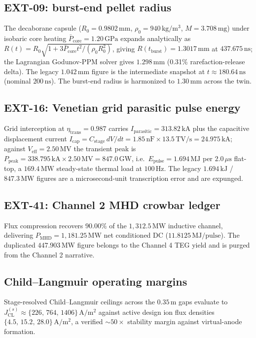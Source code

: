 \subsection*{EXT-09: burst-end pellet radius}
The decaborane capsule ($R_0 = 0.9802\,\mathrm{mm}$, $\rho_0 = 940\,
\mathrm{kg/m^3}$, $M = 3.708\,\mathrm{mg}$) under isobaric core heating
$\bar{P}_{\mathrm{core}} = 1.20\,\mathrm{GPa}$ expands analytically as
$R(t) = R_0\sqrt{1 + 3\bar{P}_{\mathrm{core}}t^2/(\rho_0 R_0^2)}$,
giving $R(t_{\mathrm{burst}}) = 1.3017\,\mathrm{mm}$ at
$437.675\,\mathrm{ns}$; the Lagrangian Godunov-PPM solver gives
$1.298\,\mathrm{mm}$ (0.31\% rarefaction-release delta). The legacy
$1.042\,\mathrm{mm}$ figure is the intermediate snapshot at $t \approx
180.64\,\mathrm{ns}$ (nominal $200\,\mathrm{ns}$). The burst-end radius
is harmonized to $1.30\,\mathrm{mm}$ across the twin.

\subsection*{EXT-16: Venetian grid parasitic pulse energy}
Grid interception at $\eta_{\mathrm{trans}} = 0.987$ carries
$I_{\mathrm{parasitic}} = 313.82\,\mathrm{kA}$ plus the capacitive
displacement current $I_{\mathrm{cap}} = C_{\mathrm{stage}}\,dV/dt =
1.85\,\mathrm{nF}\times13.5\,\mathrm{TV/s} = 24.975\,\mathrm{kA}$;
against $V_{\mathrm{eff}} = 2.50\,\mathrm{MV}$ the transient peak is
$P_{\mathrm{peak}} = 338.795\,\mathrm{kA} \times 2.50\,\mathrm{MV} =
847.0\,\mathrm{GW}$, i.e.\ $E_{\mathrm{pulse}} = 1.694\,\mathrm{MJ}$
per $2.0\,\mu\mathrm{s}$ flat-top, a $169.4\,\mathrm{MW}$ steady-state
thermal load at $100\,\mathrm{Hz}$. The legacy $1.694\,\mathrm{kJ}$ /
$847.3\,\mathrm{MW}$ figures are a microsecond-unit transcription error
and are expunged.

\subsection*{EXT-41: Channel 2 MHD crowbar ledger}
Flux compression recovers $90.00\%$ of the $1{,}312.5\,\mathrm{MW}$
inductive channel, delivering $P_{\mathrm{MHD}} = 1{,}181.25\,
\mathrm{MW}$ net conditioned DC ($11.8125\,\mathrm{MJ/pulse}$). The
duplicated $447.903\,\mathrm{MW}$ figure belongs to the Channel 4 TEG
yield and is purged from the Channel 2 narrative.

\subsection*{Child--Langmuir operating margins}
Stage-resolved Child--Langmuir ceilings across the $0.35\,\mathrm{m}$
gaps evaluate to $J_{\mathrm{CL}}^{(s)} \approx \{226,\,764,\,1406\}\,
\mathrm{A/m^2}$ against active design ion flux densities $\{4.5,\,15.2,\,
28.0\}\,\mathrm{A/m^2}$, a verified $\sim 50\times$ stability margin
against virtual-anode formation.
